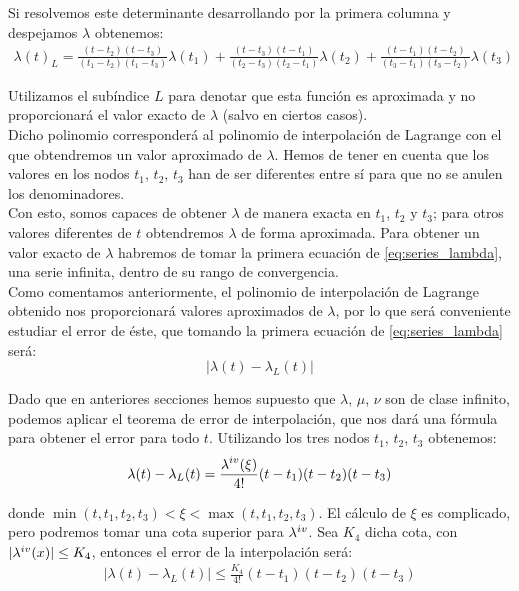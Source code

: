 \documentclass[11pt]{article}
\newcommand\ddfrac[2]{\frac{\displaystyle #1}{\displaystyle #2}}
\begin{document}
Si resolvemos este determinante desarrollando por la primera columna y despejamos $\lambda$ obtenemos:
\begin{align}
\lambda(t)_L=
\frac{(t-t_2)(t-t_3)}{(t_1-t_2)(t_1-t_3)}\lambda(t_1)
+\frac{(t-t_3)(t-t_1)}{(t_2-t_3)(t_2-t_1)}\lambda(t_2)
+\frac{(t-t_1)(t-t_2)}{(t_3-t_1)(t_3-t_2)}\lambda(t_3)
\label{eq:lambda_value}
\end{align}

Utilizamos el subíndice $L$ para denotar que esta función es aproximada y no proporcionará el valor exacto de $\lambda$ (salvo en ciertos casos).\\

Dicho polinomio corresponderá al polinomio de interpolación de Lagrange con el que obtendremos un valor aproximado de $\lambda$. Hemos de tener en cuenta que los valores en los nodos $t_1$, $t_2$, $t_3$ han de ser diferentes entre sí para que no se anulen los denominadores.\\

Con esto, somos capaces de obtener $\lambda$ de manera exacta en $t_1$, $t_2$ y $t_3$; para otros valores diferentes de $t$ obtendremos $\lambda$ de forma aproximada. Para obtener un valor exacto de $\lambda$ habremos de tomar la primera ecuación de \eqref{eq:series_lambda}, una serie infinita, dentro de su rango de convergencia.\\

Como comentamos anteriormente, el polinomio de interpolación de Lagrange obtenido nos proporcionará valores aproximados de $\lambda$, por lo que será conveniente estudiar el error de éste, que tomando la primera ecuación de \eqref{eq:series_lambda} será:
\[
|\lambda(t)-\lambda_L(t)|
\]

Dado que en anteriores secciones hemos supuesto que $\lambda$, $\mu$, $\nu$ son de clase infinito, podemos aplicar el teorema de error de interpolación, que nos dará una fórmula para obtener el error para todo $t$. Utilizando los tres nodos $t_1$, $t_2$, $t_3$ obtenemos:
\begin{align}
\lambda(t)-\lambda_L(t)=\ddfrac{\lambda^{\romannumeral 4}(\xi)}{4!}(t-t_1)(t-t_2)(t-t_3)
\label{eq:interpolation_error}
\end{align}

\noindent donde $\min{(t,t_1,t_2,t_3)}<\xi<\max{(t,t_1,t_2,t_3)}$. El cálculo de $\xi$ es complicado, pero podremos tomar una cota superior para $\lambda^{\romannumeral 4}$. Sea $K_4$ dicha cota, con $|\lambda^{\romannumeral 4}(x)|\leq K_4$, entonces el error de la interpolación será:
\begin{align}
|\lambda(t)-\lambda_L(t)|\leq\ddfrac{K_4}{4!}(t-t_1)(t-t_2)(t-t_3)
\label{eq:interpolation_error_cota}
\end{align}
\end{document}

